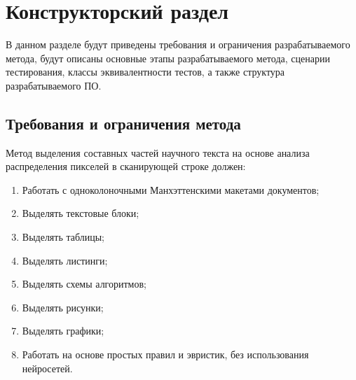 \section{Конструкторский раздел}

В данном разделе будут приведены требования и ограничения разрабатываемого метода, будут описаны основные этапы разрабатываемого метода, сценарии тестирования, классы эквивалентности тестов, а также структура разрабатываемого ПО.



\subsection{Требования и ограничения метода}

Метод выделения составных частей научного текста на основе анализа распределения пикселей в сканирующей строке должен:
\begin{enumerate}
    \item Работать с одноколоночными Манхэттенскими макетами документов;
    \item Выделять текстовые блоки;
    \item Выделять таблицы;
    \item Выделять листинги;
    \item Выделять схемы алгоритмов;
    \item Выделять рисунки;
    \item Выделять графики;
    \item Работать на основе простых правил и эвристик, без использования нейросетей.
\end{enumerate}

